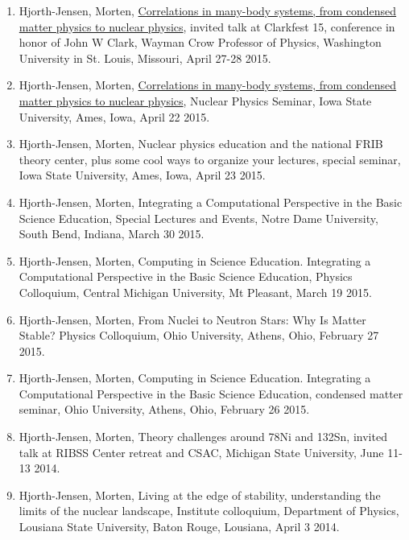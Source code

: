 \documentclass[%
oneside,                 %
final,                   %
10pt]{article}
\begin{document}
\begin{enumerate}
\item Hjorth-Jensen, Morten, \href{{http://clarkfest15.physics.wustl.edu/Docs/intro.php}}{Correlations in many-body systems, from condensed matter physics to nuclear physics}, invited talk at Clarkfest 15,  conference in honor of John W Clark, Wayman Crow Professor of Physics, Washington University in St. Louis, Missouri, April 27-28 2015.

\item Hjorth-Jensen, Morten, \href{{http://www.event.iastate.edu/event/35628}}{Correlations in many-body systems, from condensed matter physics to nuclear physics}, Nuclear Physics Seminar, Iowa State University, Ames, Iowa, April 22 2015.

\item Hjorth-Jensen, Morten, Nuclear physics education and the national FRIB theory center, plus some cool ways to organize your lectures, special seminar, Iowa State University, Ames, Iowa, April 23 2015.

\item Hjorth-Jensen, Morten, Integrating a Computational Perspective in the Basic Science Education, Special Lectures and Events, Notre Dame University, South Bend, Indiana, March 30 2015.

\item Hjorth-Jensen, Morten, Computing in Science Education.  Integrating a Computational Perspective in the Basic Science Education, Physics Colloquium, Central Michigan University, Mt Pleasant, March 19 2015.

\item Hjorth-Jensen, Morten, From Nuclei to Neutron Stars: Why Is Matter Stable? Physics Colloquium, Ohio University, Athens, Ohio,  February 27 2015.

\item Hjorth-Jensen, Morten, Computing in Science Education.  Integrating a Computational Perspective in the Basic Science Education, condensed matter seminar, Ohio University, Athens, Ohio,  February 26 2015.

\item Hjorth-Jensen, Morten, Theory challenges around 78Ni and 132Sn, invited talk at  RIBSS Center retreat and CSAC, Michigan State University, June 11-13 2014.

\item Hjorth-Jensen, Morten, Living at the edge of stability, understanding the limits of the nuclear landscape, Institute colloquium, Department of Physics, Lousiana State University, Baton Rouge, Lousiana, April 3 2014.


\end{enumerate}
\end{document}
